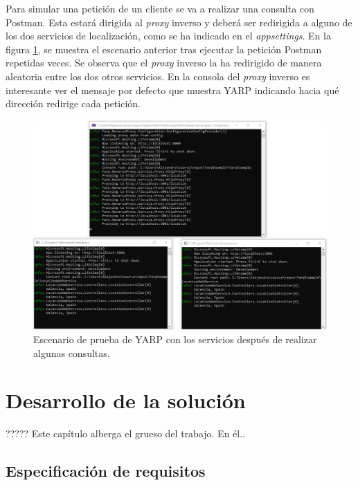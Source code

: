 \documentclass[11pt,spanish,listoffigures]{tfgetsinf}
\begin{document}
Para simular una petición de un cliente se va a realizar una consulta con Postman. Esta estará dirigida al \emph{proxy} inverso y deberá ser redirigida a alguno de los dos servicios de localización, como se ha indicado en el \emph{appsettings}. En la figura \ref{ejemploYARP_servicios_funcionando}, se muestra el escenario anterior tras ejecutar la petición Postman repetidas veces. Se observa que el \emph{proxy} inverso la ha redirigido de manera aleatoria entre los dos otros servicios. En la consola del \emph{proxy} inverso es interesante ver el mensaje por defecto que muestra YARP indicando hacia qué dirección redirige cada petición.

\begin{figure}[ht]
\centering
\includegraphics[width=1\textwidth]{imagenes/ejemploYARP/servicios_funcionando}
\caption{Escenario de prueba de YARP con los servicios después de realizar algunas consultas.}
	\label{ejemploYARP_servicios_funcionando}
\end{figure}


\chapter{Desarrollo de la solución}

????? Este capítulo alberga el grueso del trabajo. En él..


	\section{Especificación de requisitos}
\end{document}

